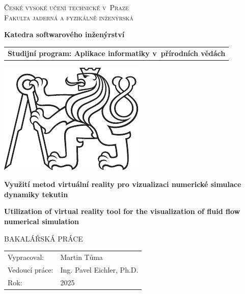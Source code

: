 \documentclass[a4paper,oneside,12pt]{book}
\newcommand{\tb}{\textbf} %
\newcommand{\cvut}{České vysoké učení technické v~Praze}
\newcommand{\fjfi}{Fakulta jaderná a fyzikálně inženýrská}
\newcommand{\katedra}{Katedra softwarového inženýrství}
\newcommand{\program}{Aplikace informatiky v~přírodních vědách} %
\newcommand{\druh}{Bakalářská práce} %
\newcommand{\logoCVUT}{\includegraphics{symbol_cvut_konturova_verze_cb.pdf}} %
\newcommand{\nazevcz}{Využití metod virtuální reality pro vizualizaci numerické simulace dynamiky tekutin}    %
\newcommand{\nazeven}{Utilization of virtual reality tool for the visualization of fluid flow numerical simulation}          %
\newcommand{\autor}{Martin Tůma}   %
\newcommand{\vedouci}{Ing. Pavel Eichler, Ph.D.} %
\newcommand{\rok}{2025}  %
\begin{document}
\thispagestyle{empty}

\begin{center}
    {\Large \textsc{\cvut}\\[4mm] \textsc{\fjfi}}\par
    \vspace{4mm}
	\tb{\katedra} \par\vspace{3mm}

    \begin{tabular}{l}
		\tb{Studijní program: \program}\\
    \end{tabular}

   \vspace{10mm} \logoCVUT \vspace{15mm} 

   {\huge \tb{\nazevcz}\par}
   \vspace{5mm}   
   {\huge \tb{\nazeven}\par}
   
   \vspace{15mm}
   {\Large \MakeUppercase{\druh}}

   \vfill
   {\large
    \begin{tabular}{ll}
    Vypracoval: & \autor\\
    Vedoucí práce: & \vedouci\\
    Rok: & \rok
    \end{tabular}
   }
\end{center}

\newpage  %
\thispagestyle{empty} %




\end{document}
